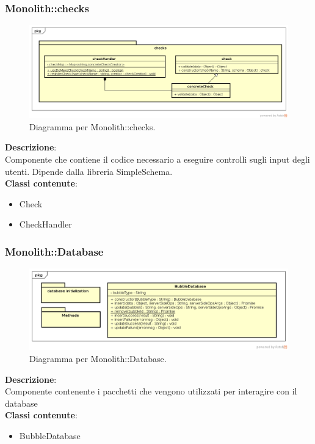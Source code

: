 \clearpage

\subsubsection{Monolith::checks}
   \FloatBarrier
   \begin{figure}[ht]
   \centering
\includegraphics[width=\textwidth,keepaspectratio]{img/controls}
   \caption{Diagramma per Monolith::checks.}
\end{figure}
\FloatBarrier
\textbf{Descrizione}:\\
 Componente che contiene il codice necessario a eseguire controlli sugli input degli utenti. Dipende dalla libreria SimpleSchema. 
\\ \textbf{Classi contenute}:\\
\begin{itemize}
\item Check
\item CheckHandler
\end{itemize}


\clearpage

\subsubsection{Monolith::Database}
   \FloatBarrier
   \begin{figure}[ht]
   \centering
\includegraphics[width=\textwidth,keepaspectratio]{img/database}
   \caption{Diagramma per Monolith::Database.}
\end{figure}
\FloatBarrier
\textbf{Descrizione}:\\
 Componente contenente i pacchetti che vengono utilizzati per interagire con il database 
\\ \textbf{Classi contenute}:\\
\begin{itemize}
\item BubbleDatabase
\end{itemize}


